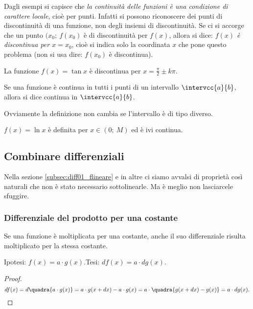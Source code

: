 Dagli esempi si capisce che \emph{la continuità delle funzioni è una condizione 
di carattere locale}, cioè per punti. Infatti si possono riconoscere dei punti
di discontinuità di una funzione, non degli insiemi di discontinuità.
Se ci si accorge che un punto $(x_0;\ f(x_0)$ è di discontinuità
per $f(x)$, allora si dice: \emph{$f(x)$ è discontinua per $x=x_0$},
cioè si indica solo la coordinata $x$ che pone questo problema 
(non si usa dire: $f(x_0)$ è discontinua).
\begin{esempio}
 La funzione $f(x)= \tan x$ è discontinua per $x=\frac{\pi}{2}\pm k\pi$.
\end{esempio}

\begin{definizione}
Se una funzione è continua in tutti i punti di un intervallo $\intervcc{a}{b}$,
allora si dice continua in $\intervcc{a}{b}$.
\end{definizione}
\begin{osservazione}
 Ovviamente la definizione non cambia se l'intervallo è di tipo diverso.
\end{osservazione}

\begin{esempio}
 $f(x)=\ln x$ è definita per $x \in (0;\ M)$ ed è ivi continua.
\end{esempio}


\subsection{Combinare differenziali}
\label{subsec:diff01_combdiff}
Nella sezione \ref{subsec:diff01_flineare} e in altre ci siamo avvalsi di proprietà
così naturali che non è stato necessario sottolinearle. Ma è meglio non lasciarcele 
sfuggire.

\subsubsection{Differenziale del prodotto per una costante}
\label{}
\begin{teorema}
 Se una funzione è moltiplicata per una costante, anche il suo differenziale risulta 
 moltiplicato per la stessa costante.
\end{teorema}
\noindent Ipotesi: $f(x)=a\cdot g(x)$.\tab Tesi: $df(x)=a\cdot dg(x)$.

\begin{proof}
\[
 df(x)=d\quadra{a\cdot g(x)}= a\cdot g(x+dx)-a\cdot g(x)=a\cdot\quadra{g(x+dx)-g(x)}
 =a\cdot dg(x).
\]
\end{proof}

